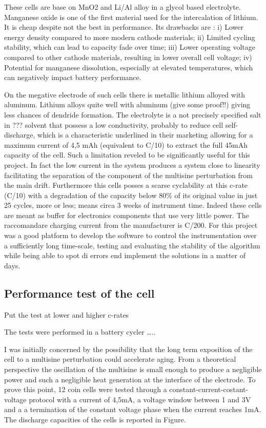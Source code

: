 These cells are base on MnO2 and  Li/Al alloy in a glycol based electrolyte. Manganese oxide is one of the first material used for the intercalation of lithium. It is cheap despite not the best in performance. Its drawbacks are : i) Lower energy density compared to more modern cathode materials; ii) Limited cycling stability, which can lead to capacity fade over time; iii) Lower operating voltage compared to other cathode materials, resulting in lower overall cell voltage; iv) Potential for manganese dissolution, especially at elevated temperatures, which can negatively impact battery performance.

On the megative electrode of such cells there is metallic lithium alloyed with aluminum. Lithium alloys quite well with aluminum (give some proof!!) giving less chances of dendride formation. The electrolyte is a not precisely specified salt in ??? solvent that possess a low conductivity, probably to reduce cell self-discharge, which is a characteristic underlined in their marketing  allowing for a maximum current of 4,5 mAh (equivalent to C/10) to extract the full 45mAh capacity of the cell. Such a limitation reveled to be significantly useful for this project. In fact the low current in the system produces a system close to linearity facilitating the separation of the component of the multisine perturbation from the main drift. Furthermore this cells posses a scarse cyclability at this c-rate (C/10) with a degradation of the capacity below 80\% of its original value in just 25 cycles, more or less; means circa 3 weeks of instrument time. Indeed these cells are meant as buffer for electronics components that use very little power. The raccomandare charging current from the manufacturer is C/200. For this project was a good platform to develop the software to control the instrumentation over a sufficiently long time-scale, testing and evaluating the stability of the algorithm while being able to spot di errors end implement the solutions in a matter of days.

\subsection{Performance test of the cell}

\colorbox{BurntOrange}{Put the test at lower  and higher c-rates}

\colorbox{BurntOrange}{The tests were performed in a battery cycler …..}

I was initially concerned by the possibility that the long term exposition of the cell to a multisine perturbation could accelerate aging. From a theoretical perspective the oscillation of the multisine is small enough to produce a negligible power and such a negligible heat generation at the interface of the electrode. To prove this point, 12 coin cells were tested through a constant-current-costant-voltage protocol with a current of 4,5mA, a voltage window between 1 and 3V and a a termination of the constant voltage phase when the current reaches 1mA. The discharge capacities of the cells is reported in Figure.

